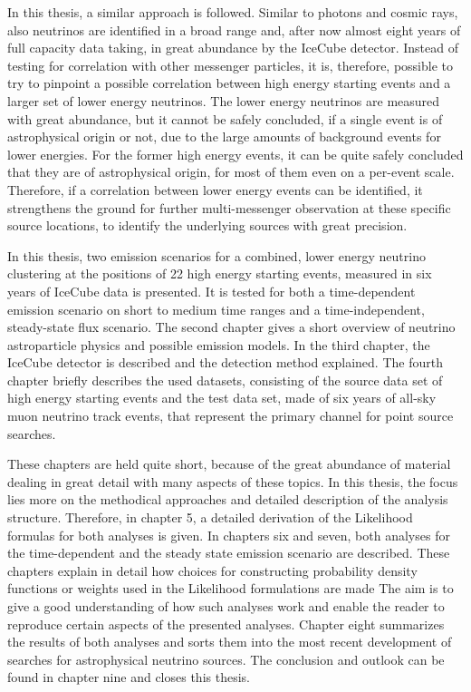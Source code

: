 In this thesis, a similar approach is followed.
Similar to photons and cosmic rays, also neutrinos are identified in a broad range and,  after now almost eight years of full capacity data taking, in great abundance by the IceCube detector.
Instead of testing for correlation with other messenger particles, it is, therefore, possible to try to pinpoint a possible correlation between high energy starting events and a larger set of lower energy neutrinos.
The lower energy neutrinos are measured with great abundance, but it cannot be safely concluded, if a single event is of astrophysical origin or not, due to the large amounts of background events for lower energies.
For the former high energy events, it can be quite safely concluded that they are of astrophysical origin, for most of them even on a per-event scale.
Therefore, if a correlation between lower energy events can be identified, it strengthens the ground for further multi-messenger observation at these specific source locations, to identify the underlying sources with great precision.

In this thesis, two emission scenarios for a combined, lower energy neutrino clustering at the positions of 22 high energy starting events, measured in six years of IceCube data is presented.
It is tested for both a time-dependent emission scenario on short to medium time ranges and a time-independent, steady-state flux scenario.
The second chapter gives a short overview of neutrino astroparticle physics and possible emission models.
In the third chapter, the IceCube detector is described and the detection method explained.
The fourth chapter briefly describes the used datasets, consisting of the source data set of high energy starting events and the test data set, made of six years of all-sky muon neutrino track events, that represent the primary channel for point source searches.

These chapters are held quite short, because of the great abundance of material dealing in great detail with many aspects of these topics.
In this thesis, the focus lies more on the methodical approaches and detailed description of the analysis structure.
Therefore, in chapter 5, a detailed derivation of the Likelihood formulas for both analyses is given.
In chapters six and seven, both analyses for the time-dependent and the steady state emission scenario are described.
These chapters explain in detail how choices for constructing probability density functions or weights used in the Likelihood formulations are made
The aim is to give a good understanding of how such analyses work and enable the reader to reproduce certain aspects of the presented analyses.
Chapter eight summarizes the results of both analyses and sorts them into the most recent development of searches for astrophysical neutrino sources.
The conclusion and outlook can be found in chapter nine and closes this thesis.
